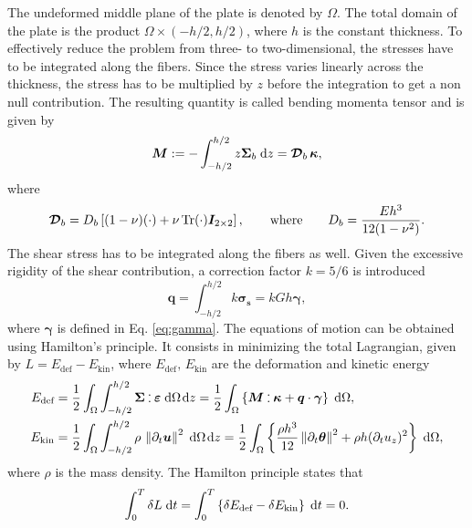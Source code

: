 The undeformed middle plane of the plate is denoted by $\Omega$. The total domain of the plate is the product $\Omega \times (-h/2, h/2)$, where $h$ is the constant thickness. To effectively reduce the problem from three- to two-dimensional, the stresses have to be integrated along the fibers. Since the stress varies linearly across the thickness, the stress has to be multiplied by $z$ before the integration to get a non null contribution. The resulting quantity is called bending momenta tensor and is given by 
\begin{equation}\label{eq:momenta}
\bm{M} :=-\int_{-h/2}^{h/2} z \bm{\Sigma}_{b} \d{z} = \bm{\mathcal{D}}_{b} \, \bm{\kappa}, 
\end{equation}
where 
\begin{equation}\label{eq:Db}
\bm{\mathcal{D}}_{b} = D_b \left[ (1-\nu) (\cdot) + \nu \operatorname{Tr}(\cdot) \bm{I}_{2\times 2} \right], \qquad \text{where} \qquad D_b = \frac{E h^3}{12(1-\nu^2)}.
\end{equation}
The shear stress has to be integrated along the fibers as well. Given the excessive rigidity of the shear contribution, a correction factor $k=5/6$ \cite[Chapter 10]{reddy2006theory} is introduced 
\begin{equation}\label{eq:shearstress}
\bm{q} = \int_{-h/2}^{h/2} k \bm{\sigma_s} = kGh \bm{\gamma},
\end{equation}
where $\bm{\gamma}$ is defined in Eq. \eqref{eq:gamma}. The equations of motion can be obtained using Hamilton's principle. It consists in minimizing the total Lagrangian, given by $L = E_{\text{def}} - E_{\text{kin}}$, where $E_{\text{def}}, \, E_{\text{kin}}$ are the deformation  and kinetic energy
\begin{align}
E_{\text{def}} &= \frac{1}{2} \int_{\Omega} \int_{-h/2}^{h/2} \bm{\Sigma} \cddot \bm{\varepsilon} \d{\Omega} \d{z} = \frac{1}{2} \int_{\Omega} \left\{\bm{M} \cddot \bm{\kappa} + \bm{q} \cdot \bm{\gamma} \right\} \d{\Omega}, \label{eq:defenMin}\\
E_{\text{kin}} &= \frac{1}{2}  \int_{\Omega} \int_{-h/2}^{h/2} \rho \,  \norm{\partial_t \bm{u}}^2 \d{\Omega} \d{z} = \frac{1}{2} \int_{\Omega} \left\{\frac{\rho h^3}{12} \norm{\partial_t \bm{\theta}}^2 + \rho h (\partial_t u_z)^2  \right\} \d{\Omega}, \label{eq:kinenMin}
\end{align}
where $\rho$ is the mass density. The Hamilton principle states that 
\begin{equation*}
\int_{0}^{T} \delta L \d{t} = \int_{0}^{T} \left\{ \delta E_{\text{def}} - \delta E_{\text{kin}} \right\} \d{t} = 0.
\end{equation*}
